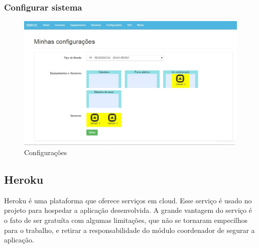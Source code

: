 \subsubsection{Configurar sistema}
\begin{figure}[H]
\centering
\includegraphics[width=1\textwidth]{figuras/configuracoes.jpg}
\caption{\label{fig:telas-config} Configurações}
\end{figure}





\subsection{Heroku}

Heroku é uma plataforma que oferece serviços em cloud. Esse serviço é usado no projeto para hospedar a aplicação desenvolvida. A grande vantagem do serviço  é o fato de ser gratuíta com algumas limitações, que não se tornaram empecilhos para o trabalho, e retirar a responsabilidade do módulo coordenador de segurar a aplicação.